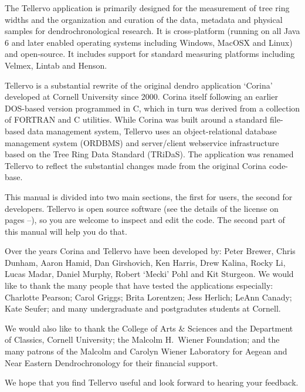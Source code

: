 The Tellervo application is primarily designed for the measurement of tree ring widths and the organization and curation of the data, metadata and physical samples for dendrochronological research. It is cross-platform (running on all Java 6 and later enabled operating systems including Windows, MacOSX and Linux) and open-source. It includes support for standard measuring platforms including Velmex, Lintab and Henson.

Tellervo is a substantial rewrite of the original dendro application `Corina' developed at Cornell University since 2000.  Corina itself following an earlier DOS-based version programmed in C, which in turn was derived from a collection of FORTRAN and C utilities.  While Corina was built around a standard file-based data management system, Tellervo uses an object-relational database management system (ORDBMS) and server/client webservice infrastructure based on the Tree Ring Data Standard (TRiDaS).  The application was renamed Tellervo to reflect the substantial changes made from the original Corina code-base. 

This manual is divided into two main sections, the first for users, the second for developers.  Tellervo is open source software (see the details of the license on pages \pageref{txt:licenseStart}--\pageref{txt:licenseEnd}), so you are welcome to inspect and edit the code.  The second part of this manual will help you do that.

Over the years Corina and Tellervo have been developed by: Peter Brewer, Chris Dunham, Aaron Hamid, Dan Girshovich, Ken Harris, Drew Kalina, Rocky Li, Lucas Madar, Daniel Murphy, Robert `Mecki' Pohl and Kit Sturgeon.  We would like to thank the many people that have tested the applications especially: Charlotte Pearson; Carol Griggs; Brita Lorentzen; Jess Herlich; LeAnn Canady; Kate Seufer; and many undergraduate and postgradutes students at Cornell.  

We would also like to thank the College of Arts \& Sciences and the Department of Classics, Cornell University; the Malcolm H.\ Wiener Foundation; and the many patrons of the Malcolm and Carolyn Wiener Laboratory for Aegean and Near Eastern Dendrochronology for their financial support.  

We hope that you find Tellervo useful and look forward to hearing your feedback.  



